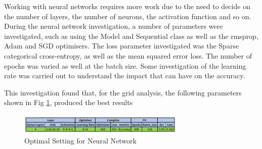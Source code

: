 \documentclass[conference]{IEEEtran}
\begin{document}


Working with neural networks requires more work due to the need to decide on the number of layers, the number of neurons, the activation function and so on. During the neural network investigation, a number of parameters were investigated, such as using the Model and Sequential class as well as the rmsprop, Adam and SGD optimisers. The loss parameter investigated was the Sparse categorical cross-entropy, as well as the mean squared error loss. The number of epochs was varied as well at the batch size. Some investigation of the learning rate was carried out to understand the impact that can have on the accuracy. 

This investigation found that, for the grid analysis, the following parameters shown in Fig \ref{fig:nn_settings}, produced the best results

\begin{figure}[ht]
\includegraphics[width=8cm, height=1cm]{images/nn_settings.png}
\centering
\caption{Optimal Setting for Neural Network}
\label{fig:nn_settings}
\end{figure}
\end{document}

